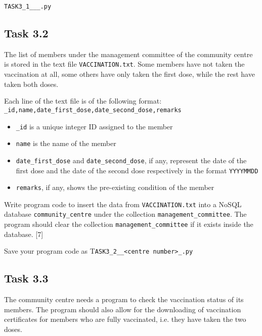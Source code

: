 \noindent \texttt{TASK3\_1\_<your name>\_<centre number>\_<index number>.py}

\subsection*{Task 3.2}

\noindent The list of members under the management committee of the
community centre is stored in the text file \texttt{VACCINATION.txt}.
Some members have not taken the vaccination at all, some others have
only taken the first dose, while the rest have taken both doses.

\noindent Each line of the text file is of the following format: \texttt{\_id,name,date\_first\_dose,date\_second\_dose,remarks}
\begin{itemize}
\item \texttt{\_id} is a unique integer ID assigned to the member 
\item \texttt{name} is the name of the member 
\item \texttt{date\_first\_dose} and \texttt{date\_second\_dose}, if any,
represent the date of the first dose and the date of the second dose
respectively in the format \texttt{YYYYMMDD} 
\item \texttt{remarks}, if any, shows the pre-existing condition of the
member
\end{itemize}
\noindent Write program code to insert the data from \texttt{VACCINATION.txt}
into a NoSQL database \texttt{community\_centre} under the collection
\texttt{management\_committee}. The program should clear the collection
\texttt{management\_committee} if it exists inside the database. \hfill{}{[}7{]}

\noindent Save your program code as T\texttt{ASK3\_2\_<your name>\_<centre
number>\_<index number>.py}

\subsection*{Task 3.3}

\noindent The community centre needs a program to check the vaccination
status of its members. The program should also allow for the downloading
of vaccination certificates for members who are fully vaccinated,
i.e. they have taken the two doses.

